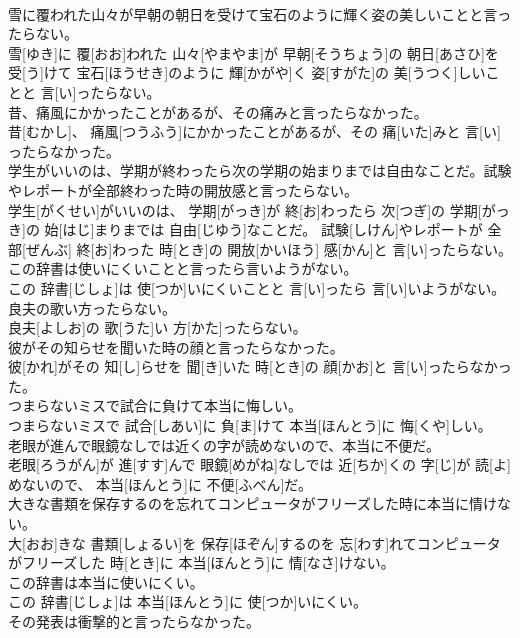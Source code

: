 \documentclass[8pt]{extreport}
\begin{document}
\begin{CJK}{UTF8}{min}
\\	雪に覆われた山々が早朝の朝日を受けて宝石のように輝く姿の美しいことと言ったらない。	
\\	雪[ゆき]に 覆[おお]われた 山々[やまやま]が 早朝[そうちょう]の 朝日[あさひ]を 受[う]けて 宝石[ほうせき]のように 輝[かがや]く 姿[すがた]の 美[うつく]しいことと 言[い]ったらない。
\\	昔、痛風にかかったことがあるが、その痛みと言ったらなかった。	
\\	昔[むかし]、 痛風[つうふう]にかかったことがあるが、その 痛[いた]みと 言[い]ったらなかった。
\\	学生がいいのは、学期が終わったら次の学期の始まりまでは自由なことだ。試験やレポートが全部終わった時の開放感と言ったらない。	
\\	学生[がくせい]がいいのは、 学期[がっき]が 終[お]わったら 次[つぎ]の 学期[がっき]の 始[はじ]まりまでは 自由[じゆう]なことだ。 試験[しけん]やレポートが 全部[ぜんぶ] 終[お]わった 時[とき]の 開放[かいほう] 感[かん]と 言[い]ったらない。
\\	この辞書は使いにくいことと言ったら言いようがない。	
\\	この 辞書[じしょ]は 使[つか]いにくいことと 言[い]ったら 言[い]いようがない。
\\	良夫の歌い方ったらない。	
\\	良夫[よしお]の 歌[うた]い 方[かた]ったらない。
\\	彼がその知らせを聞いた時の顔と言ったらなかった。	
\\	彼[かれ]がその 知[し]らせを 聞[き]いた 時[とき]の 顔[かお]と 言[い]ったらなかった。
\\	つまらないミスで試合に負けて本当に悔しい。	
\\	つまらないミスで 試合[しあい]に 負[ま]けて 本当[ほんとう]に 悔[くや]しい。
\\	老眼が進んで眼鏡なしでは近くの字が読めないので、本当に不便だ。	
\\	老眼[ろうがん]が 進[すす]んで 眼鏡[めがね]なしでは 近[ちか]くの 字[じ]が 読[よ]めないので、 本当[ほんとう]に 不便[ふべん]だ。
\\	大きな書類を保存するのを忘れてコンピュータがフリーズした時に本当に情けない。	
\\	大[おお]きな 書類[しょるい]を 保存[ほぞん]するのを 忘[わす]れてコンピュータがフリーズした 時[とき]に 本当[ほんとう]に 情[なさ]けない。
\\	この辞書は本当に使いにくい。	
\\	この 辞書[じしょ]は 本当[ほんとう]に 使[つか]いにくい。
\\	その発表は衝撃的と言ったらなかった。	

\end{CJK}
\end{document}

